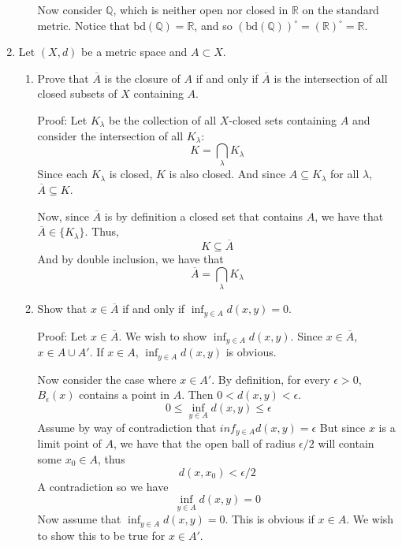 \documentclass{article}
\begin{document}
\begin{enumerate}
\begin{enumerate}
        Now consider $\mathbb{Q}$, which is neither open nor closed in $\mathbb{R}$ on the standard metric. Notice that $\text{bd}(\mathbb{Q}) = \mathbb{R}$, and so $(\text{bd}(\mathbb{Q}))^{\circ} = (\mathbb{R})^{\circ} = \mathbb{R}$.
        
    \end{enumerate}
     
     \item Let $(X,d)$ be a metric space and $A \subset X$.
     \begin{enumerate}
         \item Prove that $\overline{A}$ is the closure of $A$ if and only if $\overline{A}$ is the intersection of all closed subsets of $X$ containing $A$.
         
         Proof: Let $K_{\lambda}$ be the collection of all $X$-closed sets containing $A$ and consider the intersection of all $K_{\lambda}$:
         \[K = \bigcap_{\lambda} K_{\lambda}\]
         Since each $K_{\lambda}$ is closed, $K$ is also closed. And since $A \subseteq K_{\lambda}$ for all $\lambda$, $\overline{A} \subseteq K$.
         
         Now, since $\overline{A}$ is by definition a closed set that contains $A$, we have that $\overline{A} \in \{K_{\lambda}\}$. Thus,
         \[K \subseteq \overline{A}\]
         And by double inclusion, we have that 
         \[\overline{A} = \bigcap_{\lambda} K_{\lambda}\]
         
         \item Show that $x \in \overline{A}$ if and only if $\inf_{y \in A} d(x,y) = 0$.
         
         Proof: Let $x \in \overline{A}$. We wish to show $\inf_{y \in A} d(x,y)$. Since $x \in \overline{A}$, $x \in A \cup A'$. If $x \in A$, $\inf_{y \in A} d(x,y)$ is obvious. 
         
         Now consider the case where $x \in A'$. By definition, for every $\epsilon > 0$, $B_{\epsilon}(x)$ contains a point in $A$. Then $0 < d(x,y) < \epsilon$. 
         \[\ 0 \leq \inf_{y \in A} d(x,y) \leq \epsilon\]
         Assume by way of contradiction that $inf_{y \in A} d(x,y) = \epsilon$
         But since $x$ is a limit point of $A$, we have that the open ball of radius $\epsilon / 2$ will contain some $x_0 \in A$, thus 
         \[d(x,x_0) < \epsilon / 2\]
         A contradiction
        so we have
        \[\inf_{y \in A} d(x,y) = 0\]
        Now assume that $\inf_{y \in A} d(x,y) = 0$. This is obvious if $x \in A$. We wish to show this to be true for $x \in A'$. 
        

\end{enumerate}
\end{enumerate}
\end{document}
